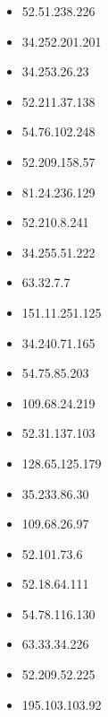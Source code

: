 \documentclass{article}
\begin{document}
\begin{itemize}
        \item 52.51.238.226
    
        \item 34.252.201.201
    
        \item 34.253.26.23
    
        \item 52.211.37.138
    
        \item 54.76.102.248
    
        \item 52.209.158.57
    
        \item 81.24.236.129
    
        \item 52.210.8.241
    
        \item 34.255.51.222
    
        \item 63.32.7.7
    
        \item 151.11.251.125
    
        \item 34.240.71.165
    
        \item 54.75.85.203
    
        \item 109.68.24.219
    
        \item 52.31.137.103
    
        \item 128.65.125.179
    
        \item 35.233.86.30
    
        \item 109.68.26.97
    
        \item 52.101.73.6
    
        \item 52.18.64.111
    
        \item 54.78.116.130
    
        \item 63.33.34.226
    
        \item 52.209.52.225
    
        \item 195.103.103.92
    

\end{itemize}
\end{document}
